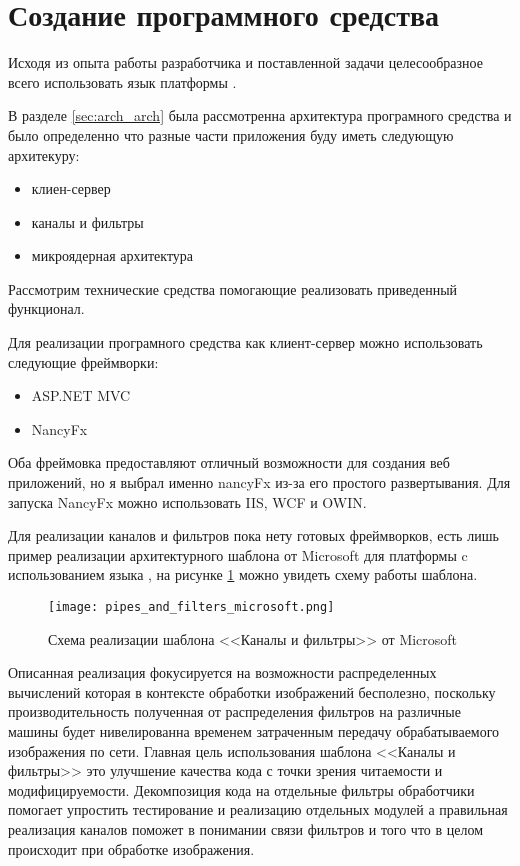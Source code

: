 \section{Создание программного средства}
\label{sec:creation}

Исходя из опыта работы разработчика и поставленной задачи целесообразное всего использовать язык \csharp{} платформы \dotnet{}.

В разделе \ref{sec:arch_arch} была рассмотренна архитектура програмного средства и было определенно что разные части приложения буду иметь следующую архитекуру:
\begin{itemize}
	\item клиен-сервер
	\item каналы и фильтры
	\item микроядерная архитектура
\end{itemize}
Рассмотрим технические средства помогающие реализовать приведенный функционал.

Для реализации програмного средства как клиент-сервер можно использовать следующие фреймворки:
\begin{itemize}
	\item ASP.NET MVC
	\item NancyFx
\end{itemize}
Оба фреймовка предоставляют отличный возможности для создания веб приложений, но я выбрал именно nancyFx из-за его простого развертывания. Для запуска NancyFx можно использовать IIS, WCF и OWIN.

Для реализации каналов и фильтров пока нету готовых фреймворков, есть лишь пример реализации архитектурного шаблона от Microsoft для платформы c использованием языка \csharp{} \cite{pipes_and_filters_pattern}, на рисунке \ref{fig:creation:pipes_and_filters_microsoft} можно увидеть схему работы шаблона.

\begin{figure}[ht] 
    \centering
    \texttt{[image: pipes\_and\_filters\_microsoft.png]}  
    \caption{Схема реализации шаблона <<Каналы и фильтры>> от Microsoft}
    \label{fig:creation:pipes_and_filters_microsoft}
\end{figure}

Описанная реализация фокусируется на возможности распределенных вычислений которая в контексте обработки изображений бесполезно, поскольку производительность полученная от распределения фильтров на различные машины будет нивелированна временем затраченным передачу обрабатываемого изображения по сети. Главная цель использования шаблона <<Каналы и фильтры>> это улучшение качества кода с точки зрения читаемости и модифицируемости. Декомпозиция кода на отдельные фильтры обработчики помогает упростить тестирование и реализацию отдельных модулей а правильная реализация каналов поможет в понимании связи фильтров и того что в целом происходит при обработке изображения. 

